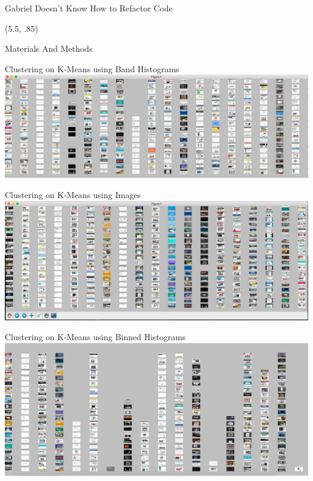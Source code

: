\documentclass{beamer}
\begin{document}
\begin{frame}{\centerline{\Huge Gabriel Doesn't Know How to Refactor Code}}
\begin{textblock}{5}
\end{textblock}

\begin{textblock}{5}(5.5, .85)
\begin{block}{Materials And Methods}

\end{block}
\begin{block}{Clustering on K-Means using Band Histograms}
\includegraphics[scale=.5]{histkmeans.png}
\end{block}
\begin{block}{Clustering on K-Means using Images}
\includegraphics[scale=.5]{imgkmeans.png}
\end{block}
\begin{block}{Clustering on K-Means using Binned Histograms}
\includegraphics[scale=.5]{binKmeans.jpg}
\end{block}

\end{textblock}
\end{frame}
\end{document}
